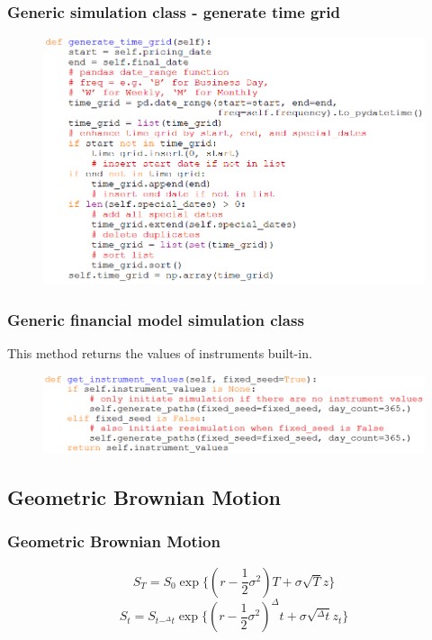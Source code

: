 \documentclass{beamer}
\begin{document}
\begin{frame}
\frametitle{Generic simulation class - generate time grid}
\begin{figure}[H]
	\includegraphics[scale=0.5]{rest_simulation_class_1.png}
\end{figure}
\end{frame}

\begin{frame}
\frametitle{Generic financial model simulation class}
This method returns the values of instruments built-in.
\begin{figure}[H]
	\includegraphics[scale=0.5]{rest_simulation_class_2.png}
\end{figure}
\end{frame}

\subsection{Geometric Brownian Motion}
\begin{frame}
\frametitle{Geometric Brownian Motion}
$$S_{T} = S_{0}\exp\{(r-\frac{1}{2}\sigma^{2})T + \sigma\sqrt{T}z\}$$
$$S_{t} = S_{t-^{\Delta}t}\exp\{(r-\frac{1}{2}\sigma^{2})^{\Delta}t + \sigma\sqrt{^{\Delta}t}z_{t}\}$$
\end{frame}
\end{document}
